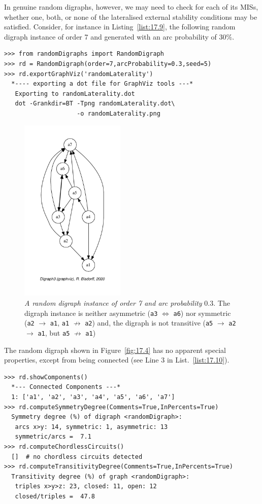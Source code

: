 In genuine random digraphs, however, we may need to check for each of its MISs, whether one, both, or none of the lateralised external stability conditions may be satisfied. Consider, for instance in Listing~\vref{list:17.9}, the following random digraph instance of order 7 and generated with an arc probability of $30\%$. 
\begin{lstlisting}[caption={Generating a random digraph \texttt{rd} of order 7 and arc probability 0.3},label=list:17.9]
>>> from randomDigraphs import RandomDigraph
>>> rd = RandomDigraph(order=7,arcProbability=0.3,seed=5)
>>> rd.exportGraphViz('randomLaterality')
  *---- exporting a dot file for GraphViz tools ---*
   Exporting to randomLaterality.dot
   dot -Grankdir=BT -Tpng randomLaterality.dot\
                    -o randomLaterality.png
\end{lstlisting}
\begin{figure}[ht]
\sidecaption[t]
\includegraphics[width=5cm]{Figures/17-4-randomLaterality.pdf}
\caption[A random digraph of order 7 and arc probability $0.3$]{\emph{A random digraph instance of order 7 and arc probability} $0.3$. The digraph instance is neither asymmetric (\texttt{a3} $\Leftrightarrow$ \texttt{a6}) nor symmetric (\texttt{a2} $\rightarrow$ \texttt{a1}, \texttt{a1} $\not\rightarrow$ \texttt{a2}) and, the digraph is not transitive (\texttt{a5} $\rightarrow$ \texttt{a2} $\rightarrow$ \texttt{a1}, but \texttt{a5} $\not\rightarrow$ \texttt{a1})} 
\label{fig:17.4}       %
\end{figure}

The random digraph shown in Figure~\vref{fig:17.4} has no apparent special properties, except from being connected (see Line 3 in List.~\vref{list:17.10}).
\begin{lstlisting}[caption={Inspecting the properties of random digraph \texttt{rd}},label=list:17.10]
>>> rd.showComponents()
  *--- Connected Components ---*
  1: ['a1', 'a2', 'a3', 'a4', 'a5', 'a6', 'a7']
>>> rd.computeSymmetryDegree(Comments=True,InPercents=True)
  Symmetry degree (%) of digraph <randomDigraph>:
   arcs x>y: 14, symmetric: 1, asymmetric: 13
   symmetric/arcs =  7.1
>>> rd.computeChordlessCircuits()
  []  # no chordless circuits detected
>>> rd.computeTransitivityDegree(Comments=True,InPercents=True)
  Transitivity degree (%) of graph <randomDigraph>:
   triples x>y>z: 23, closed: 11, open: 12
   closed/triples =  47.8
\end{lstlisting}

